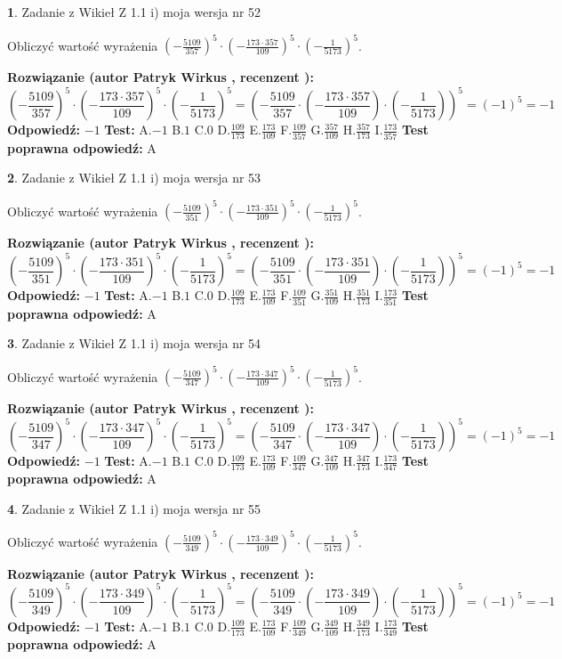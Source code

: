 \documentclass[12pt, a4paper]{article}
\theoremstyle{definition} %
\newtheorem{zad}{}
\newcommand{\zadStart}[1]{\begin{zad}#1\newline}
\newcommand{\zadStop}{\end{zad}}
\newcommand{\rozwStart}[2]{\noindent \textbf{Rozwiązanie (autor #1 , recenzent #2): }\newline}
\newcommand{\rozwStop}{\newline}
\newcommand{\odpStart}{\noindent \textbf{Odpowiedź:}\newline}
\newcommand{\odpStop}{\newline}
\newcommand{\testStart}{\noindent \textbf{Test:}\newline}
\newcommand{\testStop}{\newline}
\newcommand{\kluczStart}{\noindent \textbf{Test poprawna odpowiedź:}\newline}
\newcommand{\kluczStop}{\newline}
\begin{document}
\zadStart{Zadanie z Wikieł Z 1.1 i) moja wersja nr 52}

Obliczyć wartość wyrażenia $(-\frac{5109}{357})^{5} \cdot (-\frac{173 \cdot 357}{109})^{5} \cdot (-\frac{1}{5173})^{5}$.
\zadStop
\rozwStart{Patryk Wirkus}{}
$$(-\frac{5109}{357})^{5} \cdot (-\frac{173 \cdot 357}{109})^{5} \cdot (-\frac{1}{5173})^{5} = (-\frac{5109}{357} \cdot (-\frac{173 \cdot 357}{109}) \cdot (-\frac{1}{5173}))^{5} = (-1)^{5} = -1$$
\rozwStop
\odpStart
$-1$
\odpStop
\testStart
A.$-1$ B.$1$ C.$0$ D.$\frac{109}{173}$ E.$\frac{173}{109}$
F.$\frac{109}{357}$ G.$\frac{357}{109}$
H.$\frac{357}{173}$
I.$\frac{173}{357}$
\testStop
\kluczStart
A
\kluczStop



\zadStart{Zadanie z Wikieł Z 1.1 i) moja wersja nr 53}

Obliczyć wartość wyrażenia $(-\frac{5109}{351})^{5} \cdot (-\frac{173 \cdot 351}{109})^{5} \cdot (-\frac{1}{5173})^{5}$.
\zadStop
\rozwStart{Patryk Wirkus}{}
$$(-\frac{5109}{351})^{5} \cdot (-\frac{173 \cdot 351}{109})^{5} \cdot (-\frac{1}{5173})^{5} = (-\frac{5109}{351} \cdot (-\frac{173 \cdot 351}{109}) \cdot (-\frac{1}{5173}))^{5} = (-1)^{5} = -1$$
\rozwStop
\odpStart
$-1$
\odpStop
\testStart
A.$-1$ B.$1$ C.$0$ D.$\frac{109}{173}$ E.$\frac{173}{109}$
F.$\frac{109}{351}$ G.$\frac{351}{109}$
H.$\frac{351}{173}$
I.$\frac{173}{351}$
\testStop
\kluczStart
A
\kluczStop



\zadStart{Zadanie z Wikieł Z 1.1 i) moja wersja nr 54}

Obliczyć wartość wyrażenia $(-\frac{5109}{347})^{5} \cdot (-\frac{173 \cdot 347}{109})^{5} \cdot (-\frac{1}{5173})^{5}$.
\zadStop
\rozwStart{Patryk Wirkus}{}
$$(-\frac{5109}{347})^{5} \cdot (-\frac{173 \cdot 347}{109})^{5} \cdot (-\frac{1}{5173})^{5} = (-\frac{5109}{347} \cdot (-\frac{173 \cdot 347}{109}) \cdot (-\frac{1}{5173}))^{5} = (-1)^{5} = -1$$
\rozwStop
\odpStart
$-1$
\odpStop
\testStart
A.$-1$ B.$1$ C.$0$ D.$\frac{109}{173}$ E.$\frac{173}{109}$
F.$\frac{109}{347}$ G.$\frac{347}{109}$
H.$\frac{347}{173}$
I.$\frac{173}{347}$
\testStop
\kluczStart
A
\kluczStop



\zadStart{Zadanie z Wikieł Z 1.1 i) moja wersja nr 55}

Obliczyć wartość wyrażenia $(-\frac{5109}{349})^{5} \cdot (-\frac{173 \cdot 349}{109})^{5} \cdot (-\frac{1}{5173})^{5}$.
\zadStop
\rozwStart{Patryk Wirkus}{}
$$(-\frac{5109}{349})^{5} \cdot (-\frac{173 \cdot 349}{109})^{5} \cdot (-\frac{1}{5173})^{5} = (-\frac{5109}{349} \cdot (-\frac{173 \cdot 349}{109}) \cdot (-\frac{1}{5173}))^{5} = (-1)^{5} = -1$$
\rozwStop
\odpStart
$-1$
\odpStop
\testStart
A.$-1$ B.$1$ C.$0$ D.$\frac{109}{173}$ E.$\frac{173}{109}$
F.$\frac{109}{349}$ G.$\frac{349}{109}$
H.$\frac{349}{173}$
I.$\frac{173}{349}$
\testStop
\kluczStart
A
\kluczStop
\end{document}
